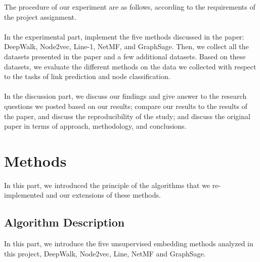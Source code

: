 \documentclass[a4paper]{article}
\begin{document}
\noindent The procedure of our experiment are as follows, according to the requirements of the project assignment. \\\\
\noindent In the experimental part, implement the five methods discussed in the paper: DeepWalk, Node2vec, Line-1, NetMF, and GraphSage. Then, we collect all the datasets presented in the paper and a few additional datasets. Based on these datasets, we evaluate the different methods on the data we collected with respect to the tasks of link prediction and node classification. \\\\
\noindent In the discussion part, we discuss our findings and give answer to the research questions we posted based on our results; compare our results to the results of the paper, and discuss the reproducibility of the study; and discuss the original paper in terms of approach, methodology, and conclusions.


\section{Methods}


\noindent In this part, we introduced the principle of the algorithms that we re-implemented and our extensions of these methods.



\subsection{Algorithm Description}
\noindent In this part, we introduce the five unsupervised embedding methods analyzed in this project, DeepWalk, Node2vec, Line, NetMF and GraphSage.
\end{document}

